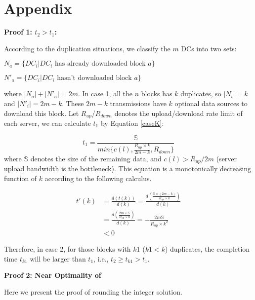 \section{Appendix}

\textbf{Proof 1: $t_2 > t_1$:}

According to the duplication situations, we classify the $m$ DCs into two sets:

$N_a = \{DC_i|DC_i \text{ has already downloaded block $a$}\}$

$N'_a = \{DC_i|DC_i \text{ hasn't downloaded block $a$}\}$

where $|N_a| + |N'_a| = 2m$. In case 1, all the $n$ blocks has $k$ duplicates, so $|N_i| = k$ and $|N'_i| = 2m-k$. These $2m-k$ transmissions have $k$ optional data sources to download this block. Let $R_{up}$/$R_{down}$ denotes the upload/download rate limit of each server, we can calculate $t_1$ by Equation \ref{caseK}:

\begin{equation}
\label{caseK}
t_1 = \frac{\mathbb{S}}{min\{c(l),\frac{R_{up}\times k}{2m-k},R_{down}\}}
\end{equation}
where $\mathbb{S}$ denotes the size of the remaining data, and $c(l) > R_{up}/2m$ (server upload bandwidth is the bottleneck). This equation is a monotonically decreasing function of $k$ according to the following calculus.

\begin{equation}
\label{calculus}
\begin{split}
t'(k) &= \frac{d(t(k))}{d(k)} = \frac{d(\frac{\mathbb{S}\times (2m-k)}{R_{up}\times k})}{d(k)} \\
    &= \frac{d(\frac{2m\times \mathbb{S}}{R_{up}\times k})}{d(k)} = -\frac{2m\mathbb{S}}{R_{up}\times k^2} \\
    &< 0
\end{split}
\end{equation}

Therefore, in case 2, for those blocks with $k1$ ($k1<k$) duplicates, the completion time $t_{k1}$ will be larger than $t_1$, i.e., $t_2 \geq t_{k1} > t_1$.

\textbf{Proof 2: Near Optimality of \name}

Here we present the proof of rounding the integer solution.

